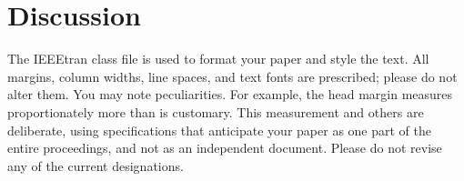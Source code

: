 
\section{Discussion} \label{sec:discussion}

The IEEEtran class file is used to format your paper and style the text. All margins, column widths, line spaces, and text fonts are prescribed; please do not  alter them. You may note peculiarities. For example, the head margin
measures proportionately more than is customary. This measurement 
and others are deliberate, using specifications that anticipate your paper 
as one part of the entire proceedings, and not as an independent document. 
Please do not revise any of the current designations.
